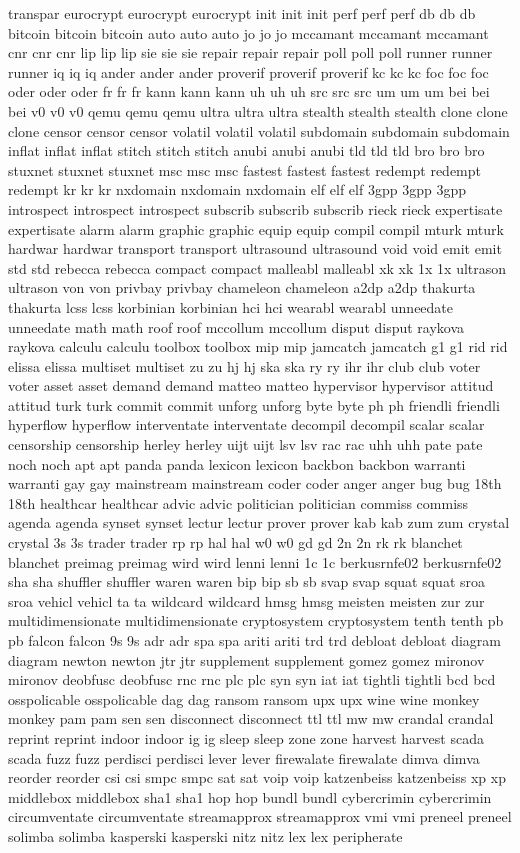 \documentclass[letterpaper,twocolumn,10pt]{article}
\begin{document}
transpar eurocrypt eurocrypt eurocrypt init init init perf perf perf db db db bitcoin bitcoin bitcoin auto auto auto jo jo jo mccamant mccamant mccamant cnr cnr cnr lip lip lip sie sie sie repair repair repair poll poll poll runner runner runner iq iq iq ander ander ander proverif proverif proverif kc kc kc foc foc foc oder oder oder fr fr fr kann kann kann uh uh uh src src src um um um bei bei bei v0 v0 v0 qemu qemu qemu ultra ultra ultra stealth stealth stealth clone clone clone censor censor censor volatil volatil volatil subdomain subdomain subdomain inflat inflat inflat stitch stitch stitch anubi anubi anubi tld tld tld bro bro bro stuxnet stuxnet stuxnet msc msc msc fastest fastest fastest redempt redempt redempt kr kr kr nxdomain nxdomain nxdomain elf elf elf 3gpp 3gpp 3gpp introspect introspect introspect subscrib subscrib subscrib rieck rieck expertisate expertisate alarm alarm graphic graphic equip equip compil compil mturk mturk hardwar hardwar transport transport ultrasound ultrasound void void emit emit std std rebecca rebecca compact compact malleabl malleabl xk xk 1x 1x ultrason ultrason von von privbay privbay chameleon chameleon a2dp a2dp thakurta thakurta lcss lcss korbinian korbinian hci hci wearabl wearabl unneedate unneedate math math roof roof mccollum mccollum disput disput raykova raykova calculu calculu toolbox toolbox mip mip jamcatch jamcatch g1 g1 rid rid elissa elissa multiset multiset zu zu hj hj ska ska ry ry ihr ihr club club voter voter asset asset demand demand matteo matteo hypervisor hypervisor attitud attitud turk turk commit commit unforg unforg byte byte ph ph friendli friendli hyperflow hyperflow interventate interventate decompil decompil scalar scalar censorship censorship herley herley uijt uijt lsv lsv rac rac uhh uhh pate pate noch noch apt apt panda panda lexicon lexicon backbon backbon warranti warranti gay gay mainstream mainstream coder coder anger anger bug bug 18th 18th healthcar healthcar advic advic politician politician commiss commiss agenda agenda synset synset lectur lectur prover prover kab kab zum zum crystal crystal 3s 3s trader trader rp rp hal hal w0 w0 gd gd 2n 2n rk rk blanchet blanchet preimag preimag wird wird lenni lenni 1c 1c berkusrnfe02 berkusrnfe02 sha sha shuffler shuffler waren waren bip bip sb sb svap svap squat squat sroa sroa vehicl vehicl ta ta wildcard wildcard hmsg hmsg meisten meisten zur zur multidimensionate multidimensionate cryptosystem cryptosystem tenth tenth pb pb falcon falcon 9s 9s adr adr spa spa ariti ariti trd trd debloat debloat diagram diagram newton newton jtr jtr supplement supplement gomez gomez mironov mironov deobfusc deobfusc rnc rnc plc plc syn syn iat iat tightli tightli bcd bcd osspolicable osspolicable dag dag ransom ransom upx upx wine wine monkey monkey pam pam sen sen disconnect disconnect ttl ttl mw mw crandal crandal reprint reprint indoor indoor ig ig sleep sleep zone zone harvest harvest scada scada fuzz fuzz perdisci perdisci lever lever firewalate firewalate dimva dimva reorder reorder csi csi smpc smpc sat sat voip voip katzenbeiss katzenbeiss xp xp middlebox middlebox sha1 sha1 hop hop bundl bundl cybercrimin cybercrimin circumventate circumventate streamapprox streamapprox vmi vmi preneel preneel solimba solimba kasperski kasperski nitz nitz lex lex peripherate 
\end{document}
